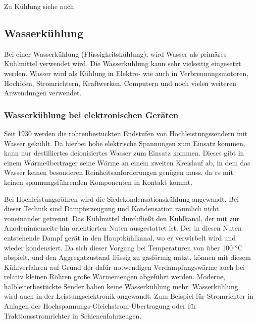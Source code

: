 
Zu Kühlung siehe auch \cite{Kuehlung1,Kuehlung2}

\newpage

\subsection{Wasserkühlung} 

Bei einer Wasserkühlung (Flüssigkeitskühlung), wird Wasser als primäres Kühlmittel verwendet wird. Die Wasserkühlung kann sehr vielseitig eingesetzt werden. Wasser wird als Kühlung in Elektro- wie auch in Verbrennungsmotoren, Hochöfen, Stromrichtern, Kraftwerken, Computern und noch vielen weiteren Anwendungen verwendet.   

\subsubsection{Wasserkühlung bei elektronischen Geräten}

Seit 1930 werden die röhrenbestückten Endstufen von Hochleistungssendern mit Wasser gekühlt. Da hierbei hohe elektrische Spannungen zum Einsatz kommen, kann nur destilliertes deionisiertes Wasser zum Einsatz kommen. Dieses gibt in einem Wärmeübertrager seine Wärme an einem zweiten Kreislauf ab, in dem das Wasser keinen besonderen Reinheitsanforderungen genügen muss, da es mit keinen spannungsführenden Komponenten in Kontakt kommt.

Bei Hochleistungsröhren wird die Siedekondensationskühlung angewandt. Bei dieser Technik sind Dampferzeugung und Kondensation räumlich nicht voneinander getrennt. Das Kühlmittel durchfließt den Kühlkanal, der mit zur Anodeninnenseite hin orientierten Nuten ausgestattet ist. Der in diesen Nuten entstehende Dampf gerät in den Hauptkühlkanal, wo er verwirbelt wird und wieder kondensiert. Da sich dieser Vorgang bei Temperaturen von über 100 °C abspielt, und den Aggregatzustand flüssig zu gasförmig nutzt, können mit diesem Kühlverfahren auf Grund der dafür notwendigen Verdampfungswärme auch bei relativ kleinen Röhren große Wärmemengen abgeführt werden.
Moderne, halbleiterbestückte Sender haben keine Wasserkühlung mehr.
Wasserkühlung wird auch in der Leistungselektronik angewandt. Zum Beispiel für Stromrichter in Anlagen der Hochspannungs-Gleichstrom-Übertragung oder für Traktionsstromrichter in Schienenfahrzeugen.


